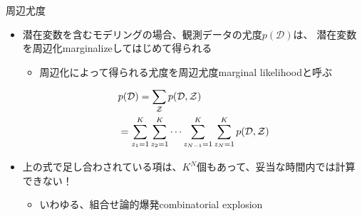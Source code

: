 \documentclass[aspectratio=169,unicode,dvipdfmx,14pt]{beamer}
\begin{document}
\begin{frame}{周辺尤度}
\begin{itemize}
\item 潜在変数を含むモデリングの場合、観測データの尤度$p(\mathcal{D})$は、
潜在変数を周辺化marginalizeしてはじめて得られる
\begin{itemize}
\item 周辺化によって得られる尤度を周辺尤度marginal likelihoodと呼ぶ
\end{itemize}
\begin{align}
& p(\mathcal{D}) = \sum_{\mathcal{Z}} p(\mathcal{D}, \mathcal{Z})
\notag \\ &
= \sum_{z_1=1}^K \sum_{z_2=1}^K \cdots \sum_{z_{N-1}=1}^K \sum_{z_N=1}^K p(\mathcal{D}, \mathcal{Z})
\end{align}
\item 上の式で足し合わされている項は、$K^N$個もあって、妥当な時間内では計算できない！
\begin{itemize}
\item いわゆる、組合せ論的爆発combinatorial explosion
\end{itemize}
\end{itemize}
\end{frame}
\end{document}
